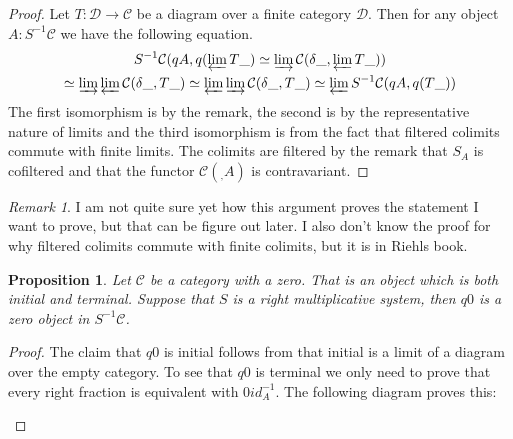 \documentclass[11pt]{article}
\newtheorem{prop}[theorem]{Proposition}
\theoremstyle{definition}
\theoremstyle{remark}
\newtheorem*{remark}{Remark}
\begin{document}
            \begin{proof}
                Let $T:\mathcal{D}\rightarrow\mathcal{C}$ be a diagram over a finite category $\mathcal{D}$. Then for any object $A:S^{-1}\mathcal{C}$ we have the following equation.
                \begin{multline*}
                    S^{-1}\mathcal{C}(qA,q(\varprojlim T\_)\simeq \varinjlim\mathcal{C}(\delta\_,\varprojlim T\_))\\
                    \simeq \varinjlim\varprojlim\mathcal{C}(\delta\_,T\_)\simeq \varprojlim\varinjlim\mathcal{C}(\delta\_,T\_)\simeq \varprojlim S^{-1}\mathcal{C}(qA,q(T\_))
                \end{multline*}
                The first isomorphism is by the remark, the second is by the representative nature of limits and the third isomorphism is from the fact that filtered colimits commute with finite limits. The colimits are filtered by the remark that $S_A$ is cofiltered and that the functor $\mathcal{C}(_,A)$ is contravariant.
            \end{proof}

            \begin{remark}
                I am not quite sure yet how this argument proves the statement I want to prove, but that can be figure out later. I also don't know the proof for why filtered colimits commute with finite colimits, but it is in Riehls book.
            \end{remark}

            \begin{prop}
                Let $\mathcal{C}$ be a category with a zero. That is an object which is both initial and terminal. Suppose that $S$ is a right multiplicative system, then $q0$ is a zero object in $S^{-1}\mathcal{C}$.
            \end{prop}

            \begin{proof}
                The claim that $q0$ is initial follows from that initial is a limit of a diagram over the empty category. To see that $q0$ is terminal we only need to prove that every right fraction is equivalent with $0id_A^{-1}$. The following diagram proves this:
                \begin{center}
                \end{center}
            \end{proof}
\end{document}
